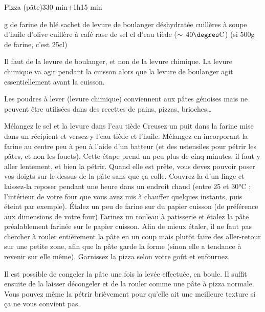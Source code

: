 \begin{recette}{Pizza (pâte)}{3}{30 min+1h}{15 min}
\begin{ingredients}
 g de farine de blé
 sachet de levure de boulanger déshydratée
 cuillères à soupe d’huile d’olive
 cuillère à café rase de sel
 cl d’eau tiède ($\sim\unit{40\degres C}$) (si 500g de farine, c'est 25cl)

\end{ingredients}
\begin{remarque}
Il faut de la levure de boulanger, et non de la levure chimique. La levure chimique va agir pendant la cuisson alors que la levure de boulanger agit essentiellement avant la cuisson. 

Les poudres à lever (levure chimique) conviennent aux pâtes génoises mais ne peuvent être utilisées dans des recettes de pains, pizzas, brioches\dots
\end{remarque}

\begin{preparation}
\etape Mélangez le sel et la levure dans l'eau tiède
\etape Creusez un puit dans la farine mise dans un récipient et versez-y l'eau tiède et l'huile. 
\etape Mélangez en incorporant la farine au centre peu à peu à l'aide d'un batteur (et des ustensiles pour pétrir les pâtes, et non les fouets).
\etape Cette étape prend un peu plus de cinq minutes, il faut y aller lentement, et bien la pétrir. Quand elle est prête, vous devez pouvoir poser vos doigts sur le dessus de la pâte sans que ça colle.
\etape Couvrez la d'un linge et laissez-la reposer pendant une heure dans un endroit chaud (entre 25 et 30°C ; l'intérieur de votre four que vous avez mis à chauffer quelques instants, puis éteint par exemple).
\etape Étalez un peu de farine sur du papier cuisson (de préférence aux dimensions de votre four)
\etape Farinez un rouleau à patisserie et étalez la pâte préalablement farinée sur le papier cuisson. Afin de mieux étaler, il ne faut pas chercher à rouler entièrement la pâte en un coup mais plutôt faire des aller-retour sur une petite zone, afin que la pâte garde la forme (sinon elle a tendance à revenir sur elle même).
\etape Garnissez la pizza selon votre goût et enfournez.
\end{preparation}

\begin{remarque}
Il est possible de congeler la pâte une fois la levée effectuée, en boule. Il suffit ensuite de la laisser décongeler et de la rouler comme une pâte à pizza normale. Vous pouvez même la pétrir brièvement pour qu'elle ait une meilleure texture si ça ne vous convient pas.


\end{remarque}
\end{recette}
